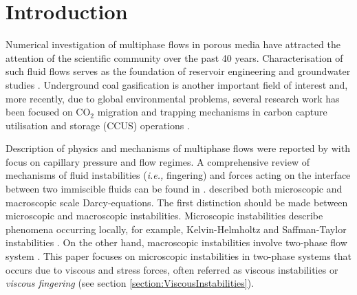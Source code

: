 \documentclass[preprint,authoryear,12pt]{elsarticle}
\newcommand{\red}{\textcolor{red}}
\newcommand{\ie}{{\it i.e., }}
\begin{document}
\section{Introduction}\label{section:intro}
\medskip
Numerical investigation of multiphase flows in porous media have attracted the attention of the scientific community over the past 40 years. Characterisation of such fluid flows serves as the foundation of reservoir engineering and groundwater studies \citep{white_1981}. %
Underground coal gasification is another important field of interest and, more recently, due to global environmental problems, several research work has been focused on CO$_{2}$ migration and trapping mechanisms in carbon capture utilisation and storage (CCUS) operations \citep{spycher_2003, self_2012, jiang_2011}.

\medskip
Description of physics and mechanisms of multiphase flows were reported by \citet{wooding_1976} with focus on capillary pressure and flow regimes. A comprehensive review of mechanisms of fluid instabilities (\ie fingering) and forces acting on the interface between two immiscible fluids can be found in \citet{homsy_1987}. \citet{adler_1988} described both microscopic and macroscopic scale Darcy-equations.
The first distinction should be made between microscopic and macroscopic instabilities. Microscopic instabilities describe phenomena occurring locally, for example, Kelvin-Helmholtz and Saffman-Taylor instabilities \citep{saffman_1959}. On the other hand, macroscopic instabilities involve two-phase flow system \citep{bottoni_1992}. This paper focuses on microscopic instabilities in two-phase systems that occurs due to viscous and stress forces, often referred as viscous instabilities or \textit{viscous fingering} (see section \ref{section:ViscousInstabilities}).
\end{document}
